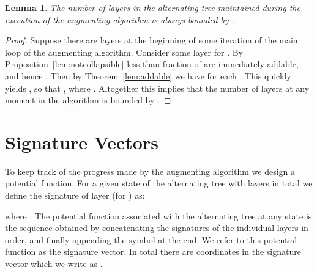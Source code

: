 \documentclass[11pt]{article}
\newtheorem{lemma}[theorem]{Lemma}
\theoremstyle{definition}
\theoremstyle{remark}
\begin{document}
\begin{lemma}\label{lem:layers}
  The number of layers in the alternating tree  maintained during the execution of the augmenting algorithm is always bounded by .
\end{lemma}

\begin{proof}
Suppose there are  layers  at the beginning of some iteration of the main loop of the augmenting algorithm. Consider some layer  for . By Proposition~\ref{lem:notcollapsible} less than  fraction of  are immediately addable, and hence . Then by Theorem~\ref{lem:addable} we have  for each . This quickly yields , so that , where . Altogether this implies that the number of layers  at any moment in the algorithm is bounded by .
\end{proof}

\section{Signature Vectors}

To keep track of the progress made by the augmenting algorithm we design a potential function. For a given state of the alternating tree with layers  in total we define the signature of layer  (for ) as:

where . The potential function associated with
the alternating tree at any state is the sequence obtained by
concatenating the signatures of the individual layers in order, and
finally appending the symbol  at the end. We refer to this
potential function as the signature vector. In total there are
 coordinates in the signature vector which we write as
.
\end{document}
